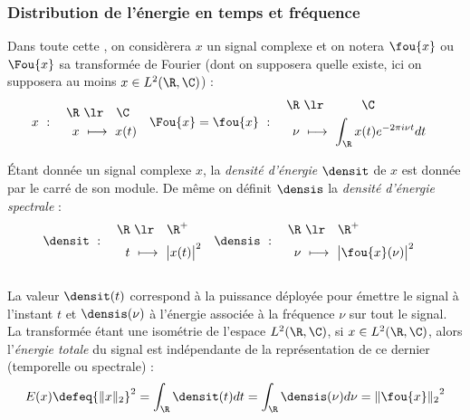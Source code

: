 \subsubsection{Distribution de l'énergie en temps et fréquence}\label{subsec:distrib_temp-freq}

Dans toute cette , on considèrera $x$ un signal complexe et on notera $\fou{x}$ ou $\Fou{x}$ sa transformée de Fourier (dont on supposera quelle existe, ici on supposera au moins $x\in L^2(\R, \C)$) :
\begin{align*}
	x\ &:\quad \begin{aligned}\R\ &\lr\quad \C \\ x\ &\longmapsto\ x(t)
	\end{aligned}  &  \Fou{x}=\fou{x}\ &:\quad \begin{aligned}\R\ &\lr\qquad\quad \C \\ \nu\ &\longmapsto\ \int_\R x(t)e^{-2\pi i \nu t}dt
	\end{aligned}
\end{align*}

\begin{definition}\label{def:densi_dE}
	Étant donnée un signal complexe $x$, la \emph{densité d'énergie} $\densit$ de $x$ est donnée par le carré de son module. De même on définit $\densis$ la \emph{densité d'énergie spectrale} :
		\begin{align}\label{eq:densi_dE}
			\densit\ &:\quad \begin{aligned}\R\ &\lr\quad \R^+ \\ t\ &\longmapsto\ \big|x(t)\big|^2 \end{aligned}  
			&
			\densis\ &:\quad \begin{aligned}\R\ &\lr\quad \R^+ \\ \nu\ &\longmapsto\ \big|\fou{x}(\nu)\big|^2 \end{aligned}
		\end{align}
	\\
	La valeur $\densit(t)$ correspond à la puissance déployée pour émettre le signal à l'instant $t$ et $\densis(\nu)$ à l'énergie associée à la fréquence $\nu$ sur tout le signal. 
	\\
	La transformée étant une isométrie de l'espace $L^2(\R,\C)$, si $x\in L^2(\R,\C)$, alors l'\emph{énergie totale} du signal est indépendante de la représentation de ce dernier (temporelle ou spectrale) :
	\begin{equation}\label{eq:parceval}
		E(x) \defeq {\|x\|_2}^2 = \int_\R \densit(t) dt = \int_\R \densis(\nu) d\nu = {\|\fou{x}\|_2}^2
	\end{equation}
\end{definition}

